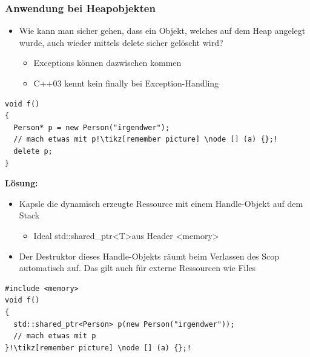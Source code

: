 \subsubsection{Anwendung bei Heapobjekten}
\begin{itemize}
  \item Wie kann man sicher gehen, dass ein Objekt, welches auf dem Heap angelegt wurde, auch wieder mittels delete sicher gelöscht wird?
  \begin{itemize}
    \item Exceptions können dazwischen kommen
    \item C++03 kennt kein finally bei Exception-Handling
  \end{itemize}
\end{itemize}
\begin{lstlisting}[style=C,escapechar=!]
void f()
{
  Person* p = new Person("irgendwer");
  // mach etwas mit p!\tikz[remember picture] \node [] (a) {};!
  delete p;
}
\end{lstlisting}
\textbf{Lösung:}
\begin{itemize}
  \item Kapsle die dynamisch erzeugte Ressource mit einem Handle-Objekt auf dem Stack
  \begin{itemize}
    \item Ideal std::shared\_ptr\textless T\textgreater aus Header \textless memory\textgreater
  \end{itemize}
  \item Der Destruktor dieses Handle-Objekts räumt beim Verlassen des Scop automatisch auf. Das gilt auch für externe Ressourcen wie Files
\end{itemize}
\begin{lstlisting}[style=C,escapechar=!]
#include <memory>
void f()
{
  std::shared_ptr<Person> p(new Person("irgendwer"));
  // mach etwas mit p
}!\tikz[remember picture] \node [] (a) {};!
\end{lstlisting}

